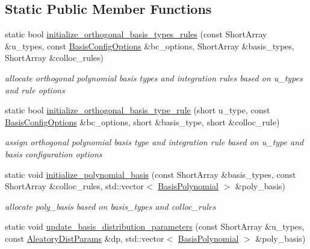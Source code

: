 \subsection*{Static Public Member Functions}
\begin{DoxyCompactItemize}
\item 
static bool \hyperlink{classPecos_1_1SharedPolyApproxData_a5c55db28633dec7b4247ae239a8667fc}{initialize\+\_\+orthogonal\+\_\+basis\+\_\+types\+\_\+rules} (const Short\+Array \&u\+\_\+types, const \hyperlink{classPecos_1_1BasisConfigOptions}{Basis\+Config\+Options} \&bc\+\_\+options, Short\+Array \&basis\+\_\+types, Short\+Array \&colloc\+\_\+rules)
\begin{DoxyCompactList}\small\item\em allocate orthogonal polynomial basis types and integration rules based on u\+\_\+types and rule options \end{DoxyCompactList}\item 
static bool \hyperlink{classPecos_1_1SharedPolyApproxData_a00f99005730aa3f491a925321b302c42}{initialize\+\_\+orthogonal\+\_\+basis\+\_\+type\+\_\+rule} (short u\+\_\+type, const \hyperlink{classPecos_1_1BasisConfigOptions}{Basis\+Config\+Options} \&bc\+\_\+options, short \&basis\+\_\+type, short \&colloc\+\_\+rule)\label{classPecos_1_1SharedPolyApproxData_a00f99005730aa3f491a925321b302c42}

\begin{DoxyCompactList}\small\item\em assign orthogonal polynomial basis type and integration rule based on u\+\_\+type and basis configuration options \end{DoxyCompactList}\item 
static void \hyperlink{classPecos_1_1SharedPolyApproxData_a9761a3bbd8c1737710737752432b533a}{initialize\+\_\+polynomial\+\_\+basis} (const Short\+Array \&basis\+\_\+types, const Short\+Array \&colloc\+\_\+rules, std\+::vector$<$ \hyperlink{classPecos_1_1BasisPolynomial}{Basis\+Polynomial} $>$ \&poly\+\_\+basis)\label{classPecos_1_1SharedPolyApproxData_a9761a3bbd8c1737710737752432b533a}

\begin{DoxyCompactList}\small\item\em allocate poly\+\_\+basis based on basis\+\_\+types and colloc\+\_\+rules \end{DoxyCompactList}\item 
static void \hyperlink{classPecos_1_1SharedPolyApproxData_a97e10bdee50a60499d893502e8294409}{update\+\_\+basis\+\_\+distribution\+\_\+parameters} (const Short\+Array \&u\+\_\+types, const \hyperlink{classPecos_1_1AleatoryDistParams}{Aleatory\+Dist\+Params} \&dp, std\+::vector$<$ \hyperlink{classPecos_1_1BasisPolynomial}{Basis\+Polynomial} $>$ \&poly\+\_\+basis)\label{classPecos_1_1SharedPolyApproxData_a97e10bdee50a60499d893502e8294409}


\end{DoxyCompactItemize}
